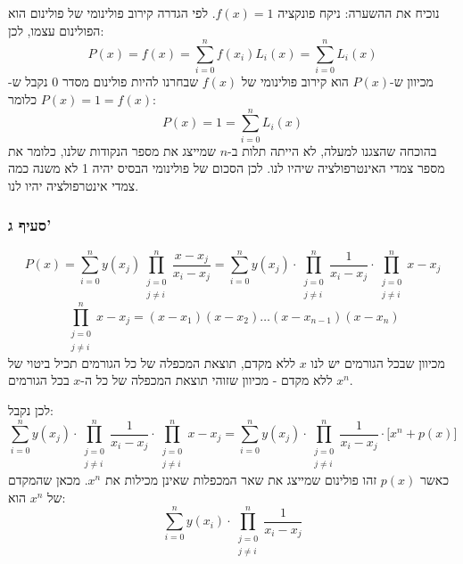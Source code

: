 \documentclass[
]{article}
\begin{document}
נוכיח את ההשערה: ניקח פונקציה \(f(x)=1\). לפי הגדרה קירוב פולינומי של
פולינום הוא הפולינום עצמו, לכן:
\[P(x)=f(x)=\sum_{i=0}^{n}f(x_{i})L_{i}(x)=\sum_{i=0}^{n}L_{i}(x)\]
מכיוון ש-\(P(x)\) הוא קירוב פולינומי של \(f(x)\) שבחרנו להיות פולינום
מסדר \(0\) נקבל ש- \(P(x)=1=f(x)\) כלומר:
\[P(x)=1=\sum_{i=0}^{n}L_{i}(x)\] בהוכחה שהצגנו למעלה, לא הייתה תלות
ב-\(n\) שמייצג את מספר הנקודות שלנו, כלומר את מספר צמדי האינטרפולציה
שיהיו לנו. לכן הסכום של פולינומי הבסיס יהיה 1 לא משנה כמה צמדי
אינטרפולציה יהיו לנו.

\subsubsection{סעיף ג'}\label{ux5e1ux5e2ux5d9ux5e3-ux5d2}

\[P(x)=\sum_{i=0}^{n}y(x_{j})\prod_{\begin{array}{c}
j=0 \\
j\neq i
\end{array}}^{n}\frac{x-x_{j}}{x_{i}-x_{j}}=\sum_{i=0}^{n}y(x_{j})\cdot \prod_{\begin{array}{c}
j=0 \\
j\neq i
\end{array}}^{n}\frac{1}{x_{i}-x_{j}}\cdot \prod_{\begin{array}{c}
j=0 \\
j\neq i
\end{array}}^{n}x-x_{j}\] \[\prod_{\begin{array}{c}
j=0 \\
j\neq i
\end{array}}^{n}x-x_{j}=(x-x_{1})(x-x_{2})\dots (x-x_{n-1})(x-x_{n})\]
מכיוון שבכל הגורמים יש לנו \(x\) ללא מקדם, תוצאת המכפלה של כל הגורמים
תכיל ביטוי של \(x^{n}\) ללא מקדם - מכיוון שזוהי תוצאת המכפלה של כל
ה-\(x\) בכל הגורמים.

לכן נקבל: \[\sum_{i=0}^{n}y(x_{j})\cdot \prod_{\begin{array}{c}
j=0 \\
j\neq i
\end{array}}^{n}\frac{1}{x_{i}-x_{j}}\cdot \prod_{\begin{array}{c}
j=0 \\
j\neq i
\end{array}}^{n}x-x_{j}=\sum_{i=0}^{n}y(x_{j})\cdot \prod_{\begin{array}{c}
j=0 \\
j\neq i
\end{array}}^{n}\frac{1}{x_{i}-x_{j}}\cdot \Big[x^{n}+p(x)\Big]\] כאשר
\(p(x)\) זהו פולינום שמייצג את שאר המכפלות שאינן מכילות את \(x^{n}\).
מכאן שהמקדם של \(x^{n}\) הוא:
\[\sum_{i=0}^{n}y(x_{i})\cdot \prod_{\begin{array}{c}
j=0 \\
j\neq i
\end{array}}^{n}\frac{1}{x_{i}-x_{j}}\]
\end{document}
